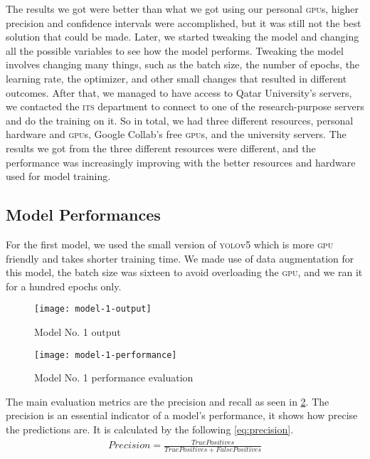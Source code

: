 \documentclass[../main.tex]{subfiles}
\begin{document}
The results we got were better than what we got using our personal 
\textsc{gpu}s, higher precision and confidence intervals were 
accomplished, but it was still not the best solution that could be made. 
Later, we started tweaking the model and changing all the possible 
variables to see how the model performs. Tweaking the model involves 
changing many things, such as the batch size, the number of epochs, the 
learning rate, the optimizer, and other small changes that resulted in 
different outcomes. 
After that, we managed to have access to Qatar University's servers, we 
contacted the \textsc{its} department to connect to one of the 
research-purpose servers and do the training on it. So in total, we had 
three different resources, personal hardware and \textsc{gpu}s, Google 
Collab's free \textsc{gpu}s, and the university servers. The results we 
got from the three different resources were different, and the 
performance was increasingly improving with the better resources and 
hardware used for model training. 


\subsection{Model Performances }

For the first model, we used the small version of \textsc{yolo}v5 which is 
more \textsc{gpu} friendly and takes shorter training time.
We made use of data augmentation for this model, the batch size was 
sixteen to avoid overloading the \textsc{gpu}, and we ran it for a 
hundred epochs only.

\begin{figure}[tbp] 
	\centering
	\texttt{[image: model-1-output]} 
	\caption{Model No. 1 output} \label{fig:model-1-output} 
\end{figure}

\begin{figure}[tbp] 
	\centering
	\texttt{[image: model-1-performance]} 
	\caption{Model No. 1 performance evaluation} \label{fig:model-1-performance} 
\end{figure}

The main evaluation metrics are the precision and recall
as seen in \cref{fig:model-1-performance}.
The precision is an essential indicator of a model's performance, it shows 
how precise the predictions are. 
It is calculated by the following \cref{eq:precision}. 
%
\begin{align}
    Precision =  \frac{True Positives}{True Positives + False Positives} \label{eq:precision}
\end{align}
\end{document}
